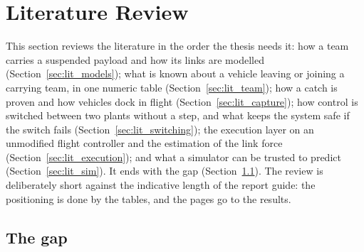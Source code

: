 \section{Literature Review}
\label{sec:lit}


This section reviews the literature in the order the thesis needs it: how a team carries a suspended payload and
how its links are modelled (Section~\ref{sec:lit_models}); what is known about a vehicle leaving or joining a
carrying team, in one numeric table (Section~\ref{sec:lit_team}); how a catch is proven and how vehicles dock in
flight (Section~\ref{sec:lit_capture}); how control is switched between two plants without a step, and what keeps
the system safe if the switch fails (Section~\ref{sec:lit_switching}); the execution layer on an unmodified flight
controller and the estimation of the link force (Section~\ref{sec:lit_execution}); and what a simulator can be
trusted to predict (Section~\ref{sec:lit_sim}). It ends with the gap (Section~\ref{sec:lit_gap}). The review is
deliberately short against the indicative length of the report guide: the positioning is done by the tables, and
the pages go to the results.













\subsection{The gap}
\label{sec:lit_gap}

